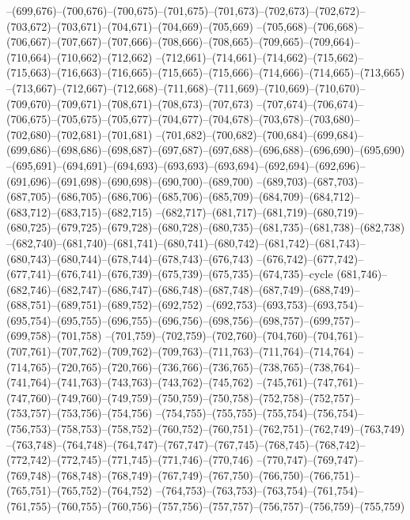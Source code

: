 --(699,676)--(700,676)--(700,675)--(701,675)--(701,673)--(702,673)--(702,672)--(703,672)--(703,671)--(704,671)--(704,669)--(705,669)
--(705,668)--(706,668)--(706,667)--(707,667)--(707,666)--(708,666)--(708,665)--(709,665)--(709,664)--(710,664)--(710,662)--(712,662)
--(712,661)--(714,661)--(714,662)--(715,662)--(715,663)--(716,663)--(716,665)--(715,665)--(715,666)--(714,666)--(714,665)--(713,665)
--(713,667)--(712,667)--(712,668)--(711,668)--(711,669)--(710,669)--(710,670)--(709,670)--(709,671)--(708,671)--(708,673)--(707,673)
--(707,674)--(706,674)--(706,675)--(705,675)--(705,677)--(704,677)--(704,678)--(703,678)--(703,680)--(702,680)--(702,681)--(701,681)
--(701,682)--(700,682)--(700,684)--(699,684)--(699,686)--(698,686)--(698,687)--(697,687)--(697,688)--(696,688)--(696,690)--(695,690)
--(695,691)--(694,691)--(694,693)--(693,693)--(693,694)--(692,694)--(692,696)--(691,696)--(691,698)--(690,698)--(690,700)--(689,700)
--(689,703)--(687,703)--(687,705)--(686,705)--(686,706)--(685,706)--(685,709)--(684,709)--(684,712)--(683,712)--(683,715)--(682,715)
--(682,717)--(681,717)--(681,719)--(680,719)--(680,725)--(679,725)--(679,728)--(680,728)--(680,735)--(681,735)--(681,738)--(682,738)
--(682,740)--(681,740)--(681,741)--(680,741)--(680,742)--(681,742)--(681,743)--(680,743)--(680,744)--(678,744)--(678,743)--(676,743)
--(676,742)--(677,742)--(677,741)--(676,741)--(676,739)--(675,739)--(675,735)--(674,735)--cycle
(681,746)--(682,746)--(682,747)--(686,747)--(686,748)--(687,748)--(687,749)--(688,749)--(688,751)--(689,751)--(689,752)--(692,752)
--(692,753)--(693,753)--(693,754)--(695,754)--(695,755)--(696,755)--(696,756)--(698,756)--(698,757)--(699,757)--(699,758)--(701,758)
--(701,759)--(702,759)--(702,760)--(704,760)--(704,761)--(707,761)--(707,762)--(709,762)--(709,763)--(711,763)--(711,764)--(714,764)
--(714,765)--(720,765)--(720,766)--(736,766)--(736,765)--(738,765)--(738,764)--(741,764)--(741,763)--(743,763)--(743,762)--(745,762)
--(745,761)--(747,761)--(747,760)--(749,760)--(749,759)--(750,759)--(750,758)--(752,758)--(752,757)--(753,757)--(753,756)--(754,756)
--(754,755)--(755,755)--(755,754)--(756,754)--(756,753)--(758,753)--(758,752)--(760,752)--(760,751)--(762,751)--(762,749)--(763,749)
--(763,748)--(764,748)--(764,747)--(767,747)--(767,745)--(768,745)--(768,742)--(772,742)--(772,745)--(771,745)--(771,746)--(770,746)
--(770,747)--(769,747)--(769,748)--(768,748)--(768,749)--(767,749)--(767,750)--(766,750)--(766,751)--(765,751)--(765,752)--(764,752)
--(764,753)--(763,753)--(763,754)--(761,754)--(761,755)--(760,755)--(760,756)--(757,756)--(757,757)--(756,757)--(756,759)--(755,759)
